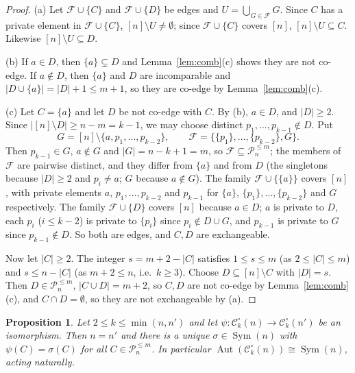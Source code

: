 \documentclass{amsart}
\newtheorem{proposition}[theorem]{Proposition}
\theoremstyle{definition}
\theoremstyle{remark}
\newcommand{\Aut}{\operatorname{Aut}}
\newcommand{\Sym}{\operatorname{Sym}}
\newcommand{\cC}{\mathcal{C}}
\newcommand{\cF}{\mathcal{F}}
\newcommand{\cP}{\mathcal{P}}
\newcommand{\nn}{[n]}
\begin{document}
\begin{proof}
(a) Let $\cF\cup\{C\}$ and $\cF\cup\{D\}$ be edges and $U=\bigcup_{G\in\cF}G$. Since $C$ has a private element in $\cF\cup\{C\}$, $\nn\setminus U\ne\emptyset$; since $\cF\cup\{C\}$ covers $\nn$, $\nn\setminus U\subseteq C$. Likewise $\nn\setminus U\subseteq D$.

(b) If $a\in D$, then $\{a\}\subsetneq D$ and Lemma~\ref{lem:comb}(c) shows they are not co-edge. If $a\notin D$, then $\{a\}$ and $D$ are incomparable and $|D\cup\{a\}|=|D|+1\le m+1$, so they are co-edge by Lemma~\ref{lem:comb}(c).

(c) Let $C=\{a\}$ and let $D$ be not co-edge with $C$. By (b), $a\in D$, and $|D|\ge 2$. Since $|\nn\setminus D|\ge n-m=k-1$, we may choose distinct $p_1,\dots,p_{k-1}\notin D$. Put
\[
G=\nn\setminus\{a,p_1,\dots,p_{k-2}\},\qquad \cF=\bigl\{\{p_1\},\dots,\{p_{k-2}\},G\bigr\}.
\]
Then $p_{k-1}\in G$, $a\notin G$ and $|G|=n-k+1=m$, so $\cF\subseteq\cP_n^{\le m}$; the members of $\cF$ are pairwise distinct, and they differ from $\{a\}$ and from $D$ (the singletons because $|D|\ge2$ and $p_i\neq a$; $G$ because $a\notin G$). The family $\cF\cup\{\{a\}\}$ covers $\nn$, with private elements $a$, $p_1,\dots,p_{k-2}$ and $p_{k-1}$ for $\{a\}$, $\{p_1\},\dots,\{p_{k-2}\}$ and $G$ respectively. The family $\cF\cup\{D\}$ covers $\nn$ because $a\in D$; $a$ is private to $D$, each $p_i$ ($i\le k-2$) is private to $\{p_i\}$ since $p_i\notin D\cup G$, and $p_{k-1}$ is private to $G$ since $p_{k-1}\notin D$. So both are edges, and $C,D$ are exchangeable.

Now let $|C|\ge 2$. The integer $s=m+2-|C|$ satisfies $1\le s\le m$ (as $2\le|C|\le m$) and $s\le n-|C|$ (as $m+2\le n$, i.e.\ $k\ge3$). Choose $D\subseteq\nn\setminus C$ with $|D|=s$. Then $D\in\cP_n^{\le m}$, $|C\cup D|=m+2$, so $C,D$ are not co-edge by Lemma~\ref{lem:comb}(c), and $C\cap D=\emptyset$, so they are not exchangeable by (a).
\end{proof}

\begin{proposition}\label{prop:rigid}
Let $2\le k\le\min(n,n')$ and let $\psi\colon\cC_k^\circ(n)\to\cC_k^\circ(n')$ be an isomorphism. Then $n=n'$ and there is a unique $\sigma\in\Sym(n)$ with $\psi(C)=\sigma(C)$ for all $C\in\cP_n^{\le m}$. In particular $\Aut(\cC_k^\circ(n))\cong\Sym(n)$, acting naturally.
\end{proposition}
\end{document}
